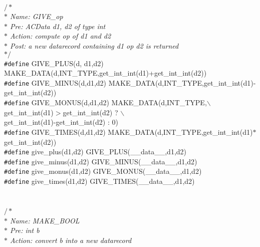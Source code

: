 \begin{flushleft}
\mbox{}\\
{$/\ast$\it{}\mbox{}\\
\hspace*{1\indentation}$\ast$ Name: GIVE\_op\mbox{}\\
\hspace*{1\indentation}$\ast$ Pre: ACData d1, d2 of type int\mbox{}\\
\hspace*{1\indentation}$\ast$ Action: compute op of d1 and d2\mbox{}\\
\hspace*{1\indentation}$\ast$ Post: a new datarecord containing d1 op d2 is returned\mbox{}\\
\hspace*{1\indentation}$\ast/$}\mbox{}\\
{\tt \#define} GIVE\_PLUS(d, d1,d2) MAKE\_DATA(d,INT\_TYPE,get\_int\_int(d1)+get\_int\_int(d2))\mbox{}\\
{\tt \#define} GIVE\_MINUS(d,d1,d2) MAKE\_DATA(d,INT\_TYPE,get\_int\_int(d1)-get\_int\_int(d2))\mbox{}\\
{\tt \#define} GIVE\_MONUS(d,d1,d2) MAKE\_DATA(d,INT\_TYPE,$\backslash$\\
\hspace*{28\indentation}get\_int\_int(d1)$>$get\_int\_int(d2) ? $\backslash$\\
\hspace*{28\indentation}get\_int\_int(d1)-get\_int\_int(d2) : 0)\mbox{}\\
{\tt \#define} GIVE\_TIMES(d,d1,d2) MAKE\_DATA(d,INT\_TYPE,get\_int\_int(d1)$\ast$get\_int\_int(d2))\mbox{}\\
{\tt \#define} give\_plus(d1,d2) GIVE\_PLUS(\_\_data\_\_,d1,d2)\mbox{}\\
{\tt \#define} give\_minus(d1,d2) GIVE\_MINUS(\_\_data\_\_,d1,d2)\mbox{}\\
{\tt \#define} give\_monus(d1,d2) GIVE\_MONUS(\_\_data\_\_,d1,d2)\mbox{}\\
{\tt \#define} give\_times(d1,d2) GIVE\_TIMES(\_\_data\_\_,d1,d2)\mbox{}\\
\mbox{}\\
\mbox{}\\
{$/\ast$\it{}\mbox{}\\
\hspace*{1\indentation}$\ast$ Name: MAKE\_BOOL\mbox{}\\
\hspace*{1\indentation}$\ast$ Pre: int b\mbox{}\\
\hspace*{1\indentation}$\ast$ Action: convert b into a new datarecord\mbox{}\\
}
\end{flushleft}
